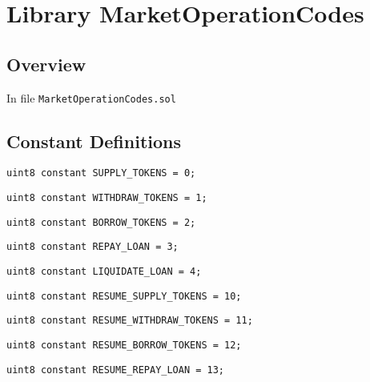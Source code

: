 
\chapter{Library MarketOperationCodes}

\minitoc

\section{Overview}


In file {\tt MarketOperationCodes.sol}

\section{Constant Definitions}


\begin{lstlisting}[firstnumber=4]
    uint8 constant SUPPLY_TOKENS = 0;
\end{lstlisting}

\begin{lstlisting}[firstnumber=5]
    uint8 constant WITHDRAW_TOKENS = 1;
\end{lstlisting}

\begin{lstlisting}[firstnumber=6]
    uint8 constant BORROW_TOKENS = 2;
\end{lstlisting}

\begin{lstlisting}[firstnumber=7]
    uint8 constant REPAY_LOAN = 3;
\end{lstlisting}

\begin{lstlisting}[firstnumber=8]
    uint8 constant LIQUIDATE_LOAN = 4;
\end{lstlisting}

\begin{lstlisting}[firstnumber=10]
    uint8 constant RESUME_SUPPLY_TOKENS = 10;
\end{lstlisting}

\begin{lstlisting}[firstnumber=11]
    uint8 constant RESUME_WITHDRAW_TOKENS = 11;
\end{lstlisting}

\begin{lstlisting}[firstnumber=12]
    uint8 constant RESUME_BORROW_TOKENS = 12;
\end{lstlisting}

\begin{lstlisting}[firstnumber=13]
    uint8 constant RESUME_REPAY_LOAN = 13;
\end{lstlisting}


